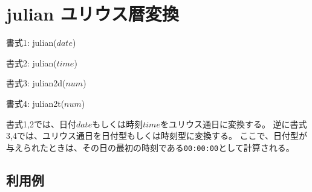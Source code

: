 
%

\section{julian ユリウス暦変換\label{sect:julian}}

書式1: julian($date$)

書式2: julian($time$)

書式3: julian2d($num$)

書式4: julian2t($num$)

書式1,2では、日付$date$もしくは時刻$time$をユリウス通日に変換する。
逆に書式3,4では、ユリウス通日を日付型もしくは時刻型に変換する。
ここで、日付型が与えられたときは、その日の最初の時刻である\verb|00:00:00|として計算される。

\subsection*{利用例}


%

